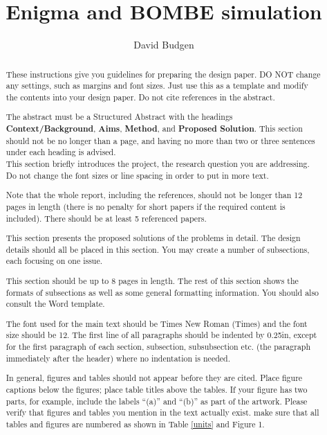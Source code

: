 \documentclass[12pt,a4paper]{article}
\title{Enigma and BOMBE simulation}
\author{David Budgen}
\date{}
\begin{document}
\maketitle

\begin{abstract}
These instructions give you guidelines for preparing the design paper.  DO NOT change any settings, such as margins and font sizes.  Just use this as a template and modify the contents into your design paper.  Do not cite references in the abstract.

The abstract must be a Structured Abstract with the headings {\bf Context/Background}, {\bf Aims}, {\bf Method}, and {\bf Proposed Solution}.  This section should not be no longer than a page, and having no more than two or three sentences under each heading is advised.
\\

This section briefly introduces the project, the research question you are addressing.  Do not change the font sizes or line spacing in order to put in more text.

Note that the whole report, including the references, should not be longer than 12 pages in length (there is no penalty for short papers if the required content is included). There should be at least 5 referenced papers.

This section presents the proposed solutions of the problems in detail. The design details should all be placed in this section. You may create a number of subsections, each focusing on one issue.

This section should be up to 8 pages in length.
The rest of this section shows the formats of subsections as well as some general formatting information.  You should also consult the Word template.

The font used for the main text should be Times New Roman (Times) and the font size should be 12.  The first line of all paragraphs should be indented by 0.25in, except for the first paragraph of each section, subsection, subsubsection etc. (the paragraph immediately after the header) where no indentation is needed.

In general, figures and tables should not appear before they are cited.  Place figure captions below the figures; place table titles above the tables.  If your figure has two parts, for example, include the labels ``(a)'' and ``(b)'' as part of the artwork.  Please verify that figures and tables you mention in the text actually exist.  make sure that all tables and figures are numbered as shown in Table \ref{units} and Figure 1.


\end{abstract}
\end{document}
